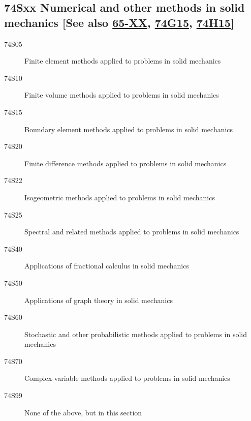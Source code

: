 \subsection*{74Sxx  Numerical and other methods in solid mechanics [See also \hyperref[65-XX]{65-XX}, \hyperref[74G15]{74G15}, \hyperref[74H15]{74H15}] }\label{74Sxx}
\begin{description}  
\item [74S05]\label{74S05} Finite element methods applied to problems in solid mechanics
\item [74S10]\label{74S10} Finite volume methods applied to problems in solid mechanics
\item [74S15]\label{74S15} Boundary element methods applied to problems in solid mechanics
\item [74S20]\label{74S20} Finite difference methods applied to problems in solid mechanics
\item [74S22]\label{74S22} Isogeometric methods applied to problems in solid mechanics
\item [74S25]\label{74S25} Spectral and related methods applied to problems in solid mechanics
\item [74S40]\label{74S40} Applications of fractional calculus in solid mechanics
\item [74S50]\label{74S50} Applications of graph theory in solid mechanics
\item [74S60]\label{74S60} Stochastic and other probabilistic methods applied to problems in solid mechanics 
\item [74S70]\label{74S70} Complex-variable methods applied to problems in solid mechanics
\item [74S99]\label{74S99} None of the above, but in this section
\end{description}

